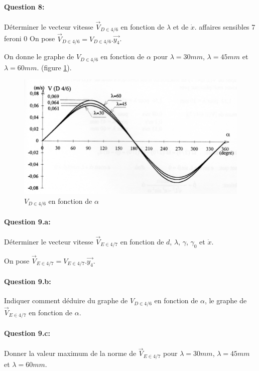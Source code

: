 \paragraph{Question 8:} Déterminer le vecteur vitesse $\vec{V}_{D\in 4/6}$ en fonction de $\lambda$ et de $\dot{x}$.
affaires sensibles 7
feroni 0
On pose $\vec{V}_{D\in 4/6}=V_{D\in 4/6}.\overrightarrow{y_4}$.

On donne le graphe de $V_{D\in 4/6}$ en fonction de $\alpha$ pour $\lambda = 30 mm$, $\lambda=45mm$ et $\lambda=60mm$. (figure \ref{commande_figure_3}).

\begin{figure}[!ht]
\begin{center}
\includegraphics[width=0.6\linewidth]{img/commande_figure_3}
\caption{$V_{D\in 4/6}$ en fonction de $\alpha$}
\label{commande_figure_3}
\end{center}
\end{figure}

\paragraph{Question 9.a:} Déterminer le vecteur vitesse $\vec{V}_{E\in 4/7}$ en fonction de $d$, $\lambda$, $\gamma$, $\gamma_0$ et $\dot{x}$.

On pose $\vec{V}_{E\in 4/7}={V}_{E\in 4/7}.\overrightarrow{y_4}$.
 
\paragraph{Question 9.b:} Indiquer comment déduire du graphe de ${V}_{D\in 4/6}$ en fonction de $\alpha$, le graphe de $\vec{V}_{E\in 4/7}$ en fonction de $\alpha$.

\paragraph{Question 9.c:} Donner la valeur maximum de la norme de $\vec{V}_{E\in 4/7}$ pour $\lambda=30mm$, $\lambda=45mm$ et $\lambda=60mm$.

